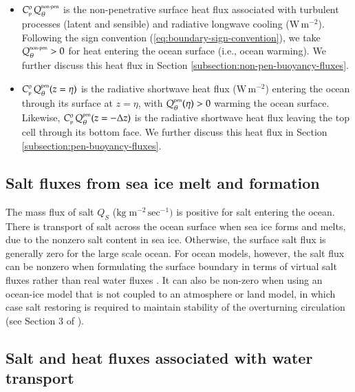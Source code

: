 \begin{itemize}
\item $C_{\mbox{\tiny p}}^{o} \, Q_{\theta}^{\mbox{\tiny non-pen}}$ is
  the non-penetrative surface heat flux associated with turbulent
  processes (latent and sensible) and radiative longwave cooling
  ($\mbox{W} \, \mbox{m}^{-2}$).  Following the sign convention
  (\ref{eq:boundary-sign-convention}), we take
  $Q_{\theta}^{\mbox{\tiny non-pen}} > 0$ for heat entering the ocean
  surface (i.e., ocean warming).  We further discuss this heat flux in
  Section \ref{subsection:non-pen-buoyancy-fluxes}.

\item $C_{\mbox{\tiny p}}^{o} \, Q_{\theta}^{\mbox{\tiny pen}}(z=\eta)$ is the
  radiative shortwave heat flux ($\mbox{W} \, \mbox{m}^{-2}$) entering
  the ocean through its surface at $z=\eta$, with
  $Q_{\theta}^{\mbox{\tiny pen}}(\eta) > 0$ warming the ocean surface.
  Likewise, $C_{\mbox{\tiny p}}^{o} \, Q_{\theta}^{\mbox{\tiny pen}}(z=-\Delta z)$ is
  the radiative shortwave heat flux leaving the top cell through its
  bottom face.  We further discuss this heat flux in Section
  \ref{subsection:pen-buoyancy-fluxes}.

\end{itemize}


\subsection{Salt fluxes from sea ice melt and formation} 
\label{subsection:sea-ice-buoyancy-fluxes}

The mass flux of salt $Q_{S}$ ($\mbox{kg} \; \mbox{m}^{-2} \,
\mbox{sec}^{-1})$ is positive for salt entering the ocean.  There is
transport of salt across the ocean surface when sea ice forms and
melts, due to the nonzero salt content in sea ice.  Otherwise, the
surface salt flux is generally zero for the large scale ocean. For
ocean models, however, the salt flux can be nonzero when formulating
the surface boundary in terms of virtual salt fluxes rather than real
water fluxes \citep{Huang1993,GriffiesPacSchmidtBalaji2001}.  It can
also be non-zero when using an ocean-ice model that is not coupled to
an atmosphere or land model, in which case salt restoring is required
to maintain stability of the overturning circulation (see Section 3 of
\cite{CORE_NYF}).


\subsection{Salt and heat fluxes associated with water transport} 
\label{subsection:advective-buoyancy-fluxes}

